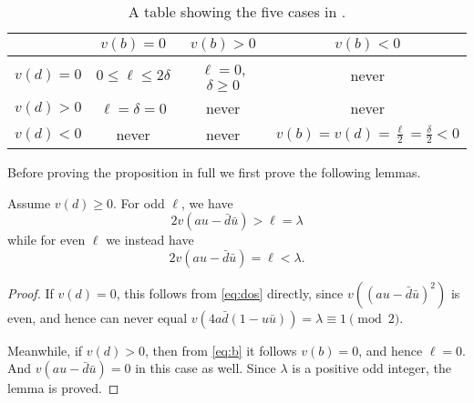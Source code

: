 \begin{table}[ht]
  \centering
  \begin{tabular}{cccc}
    \toprule
    & $v(b) = 0$ & $v(b) > 0$ & $v(b) < 0$ \\
    \midrule
    $v(d) = 0$ & $0 \le \ell \le 2 \delta$ & $\ell = 0$, $\delta \ge 0$ & never \\
    $v(d) > 0$ & $\ell = \delta = 0$ & never & never \\
    $v(d) < 0$ & never & never & $v(b) = v(d) = \frac{\ell}{2} = \frac{\delta}{2} < 0$ \\
    \bottomrule
  \end{tabular}
  \caption{A table showing the five cases in .}
  \label{tab:parameter_constraints}
\end{table}


Before proving the proposition in full we first prove the following lemmas.
\begin{lemma}
  \label{lem:au_minus_du}
  Assume $v(d) \ge 0$.
  For odd $\ell$, we have
  \[ 2 v(au - \bar d \bar u) > \ell = \lambda \]
  while for even $\ell$ we instead have
  \[ 2 v(au - \bar d \bar u) = \ell < \lambda. \]
\end{lemma}
\begin{proof}
  If $v(d) = 0$, this follows from \eqref{eq:dos} directly,
  since $v\left( (au - \bar d \bar u)^2 \right)$ is even, and hence
  can never equal $v(4a \bar d (1- u \bar u)) = \lambda \equiv 1 \pmod 2$.

  Meanwhile, if $v(d) > 0$, then from \eqref{eq:b}
  it follows $v(b) = 0$, and hence $\ell = 0$.
  And $v(au - \bar d \bar u) = 0$ in this case as well.
  Since $\lambda$ is a positive odd integer, the lemma is proved.
\end{proof}

